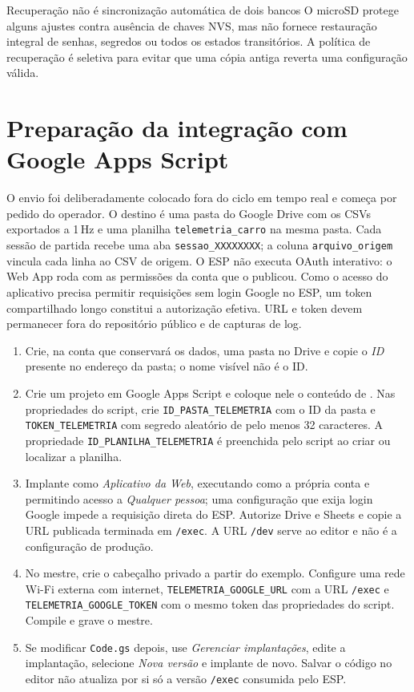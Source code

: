 \begin{nota}{Recuperação não é sincronização automática de dois bancos}
O microSD protege alguns ajustes contra ausência de chaves NVS, mas não fornece restauração integral de senhas, segredos ou todos os estados transitórios. A política de recuperação é seletiva para evitar que uma cópia antiga reverta uma configuração válida.
\end{nota}

\section{Preparação da integração com Google Apps Script}\label{sec:google_config}
O envio foi deliberadamente colocado fora do ciclo em tempo real e começa por pedido do operador. O destino é uma pasta do Google Drive com os CSVs exportados a 1\,Hz e uma planilha \texttt{telemetria\_carro} na mesma pasta. Cada sessão de partida recebe uma aba \texttt{sessao\_XXXXXXXX}; a coluna \texttt{arquivo\_origem} vincula cada linha ao CSV de origem. O ESP não executa OAuth interativo: o Web App roda com as permissões da conta que o publicou. Como o acesso do aplicativo precisa permitir requisições sem login Google no ESP, um token compartilhado longo constitui a autorização efetiva. URL e token devem permanecer fora do repositório público e de capturas de log.

\begin{enumerate}
\item Crie, na conta que conservará os dados, uma pasta no Drive e copie o \emph{ID} presente no endereço da pasta; o nome visível não é o ID.
\item Crie um projeto em Google Apps Script e coloque nele o conteúdo de . Nas propriedades do script, crie \texttt{ID\_PASTA\_TELEMETRIA} com o ID da pasta e \texttt{TOKEN\_TELEMETRIA} com segredo aleatório de pelo menos 32 caracteres. A propriedade \texttt{ID\_PLANILHA\_TELEMETRIA} é preenchida pelo script ao criar ou localizar a planilha.
\item Implante como \emph{Aplicativo da Web}, executando como a própria conta e permitindo acesso a \emph{Qualquer pessoa}; uma configuração que exija login Google impede a requisição direta do ESP. Autorize Drive e Sheets e copie a URL publicada terminada em \texttt{/exec}. A URL \texttt{/dev} serve ao editor e não é a configuração de produção.
\item No mestre, crie o cabeçalho privado  a partir do exemplo. Configure uma rede Wi-Fi externa com internet, \texttt{TELEMETRIA\_GOOGLE\_URL} com a URL \texttt{/exec} e \texttt{TELEMETRIA\_GOOGLE\_TOKEN} com o mesmo token das propriedades do script. Compile e grave o mestre.
\item Se modificar \texttt{Code.gs} depois, use \emph{Gerenciar implantações}, edite a implantação, selecione \emph{Nova versão} e implante de novo. Salvar o código no editor não atualiza por si só a versão \texttt{/exec} consumida pelo ESP.
\end{enumerate}

